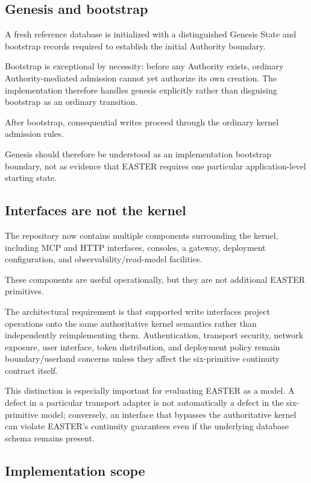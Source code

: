 \documentclass[11pt]{article}
\begin{document}
\subsection{Genesis and bootstrap}

A fresh reference database is initialized with a distinguished Genesis State and bootstrap records required to establish the initial Authority boundary.

Bootstrap is exceptional by necessity: before any Authority exists, ordinary Authority-mediated admission cannot yet authorize its own creation. The implementation therefore handles genesis explicitly rather than disguising bootstrap as an ordinary transition.

After bootstrap, consequential writes proceed through the ordinary kernel admission rules.

Genesis should therefore be understood as an implementation bootstrap boundary, not as evidence that EASTER requires one particular application-level starting state.

\subsection{Interfaces are not the kernel}

The repository now contains multiple components surrounding the kernel, including MCP and HTTP interfaces, consoles, a gateway, deployment configuration, and observability/read-model facilities.

These components are useful operationally, but they are not additional EASTER primitives.

The architectural requirement is that supported write interfaces project operations onto the same authoritative kernel semantics rather than independently reimplementing them. Authentication, transport security, network exposure, user interface, token distribution, and deployment policy remain boundary/userland concerns unless they affect the six-primitive continuity contract itself.

This distinction is especially important for evaluating EASTER as a model. A defect in a particular transport adapter is not automatically a defect in the six-primitive model; conversely, an interface that bypasses the authoritative kernel can violate EASTER's continuity guarantees even if the underlying database schema remains present.

\subsection{Implementation scope}
\end{document}
